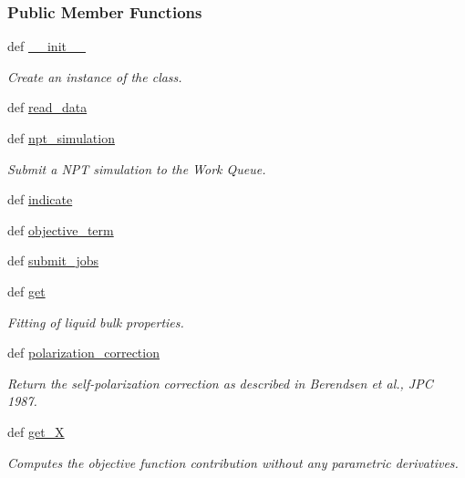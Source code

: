\subsubsection*{Public Member Functions}
\begin{DoxyCompactItemize}
\item 
def \hyperlink{classforcebalance_1_1liquid_1_1Liquid_a73a35541914580d0d918d34d94065f39}{\-\_\-\-\_\-init\-\_\-\-\_\-}
\begin{DoxyCompactList}\small\item\em Create an instance of the class. \end{DoxyCompactList}\item 
def \hyperlink{classforcebalance_1_1liquid_1_1Liquid_a08b698af913d56f780d0587821c922cd}{read\-\_\-data}
\item 
def \hyperlink{classforcebalance_1_1liquid_1_1Liquid_a07a59f9f335693329b789a9c7608fc9f}{npt\-\_\-simulation}
\begin{DoxyCompactList}\small\item\em Submit a N\-P\-T simulation to the Work Queue. \end{DoxyCompactList}\item 
def \hyperlink{classforcebalance_1_1liquid_1_1Liquid_ae94ce30dfd0e92fdd6d746e6743be844}{indicate}
\item 
def \hyperlink{classforcebalance_1_1liquid_1_1Liquid_a00c23db61bcb86cc19f79dacdb2bc1f3}{objective\-\_\-term}
\item 
def \hyperlink{classforcebalance_1_1liquid_1_1Liquid_a716e28bb5572b3273036ac753b7e1e1d}{submit\-\_\-jobs}
\item 
def \hyperlink{classforcebalance_1_1liquid_1_1Liquid_a802c4139e5c002fabdeab5de88093880}{get}
\begin{DoxyCompactList}\small\item\em Fitting of liquid bulk properties. \end{DoxyCompactList}\item 
def \hyperlink{classforcebalance_1_1liquid_1_1Liquid_a51ea9d9fb4418ec2497fe8e2d8033d41}{polarization\-\_\-correction}
\begin{DoxyCompactList}\small\item\em Return the self-\/polarization correction as described in Berendsen et al., J\-P\-C 1987. \end{DoxyCompactList}\item 
def \hyperlink{classforcebalance_1_1target_1_1Target_a606dd136f195c267c05a2455405e5949}{get\-\_\-\-X}
\begin{DoxyCompactList}\small\item\em Computes the objective function contribution without any parametric derivatives. \end{DoxyCompactList}\item 

\end{DoxyCompactItemize}
